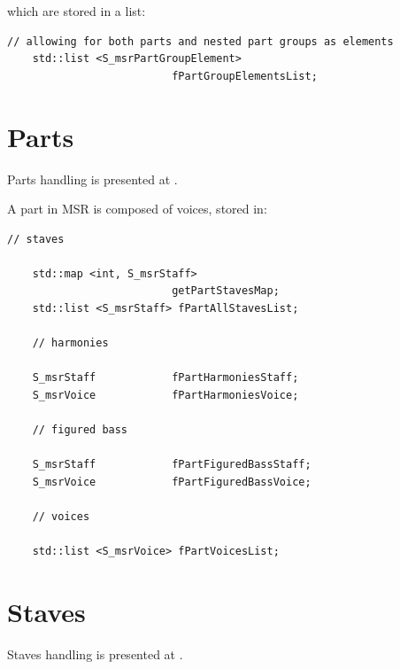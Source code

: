 which are stored in a list:
\begin{lstlisting}[language=CPlusPlus]
    // allowing for both parts and nested part groups as elements
    std::list <S_msrPartGroupElement>
                          fPartGroupElementsList;
\end{lstlisting}


\section{Parts}\label{Parts}

Parts handling is presented at .

A part in MSR is composed of voices, stored in:
\begin{lstlisting}[language=CPlusPlus]
    // staves

    std::map <int, S_msrStaff>
                          getPartStavesMap;
    std::list <S_msrStaff> fPartAllStavesList;

    // harmonies

    S_msrStaff            fPartHarmoniesStaff;
    S_msrVoice            fPartHarmoniesVoice;

    // figured bass

    S_msrStaff            fPartFiguredBassStaff;
    S_msrVoice            fPartFiguredBassVoice;

    // voices

    std::list <S_msrVoice> fPartVoicesList;
\end{lstlisting}


\section{Staves}\label{Staves}

Staves handling is presented at .

